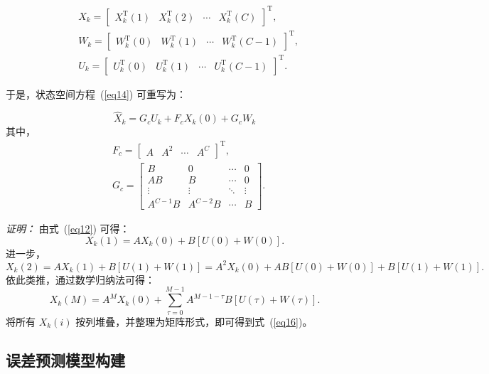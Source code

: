 \begin{equation}
\begin{aligned}
& X_k =\left[\begin{array}{llll}
X_k^{\mathrm{T}}(1) & X_k^{\mathrm{T}}(2) & \cdots & X_k^{\mathrm{T}}(C)
\end{array}\right]^{\mathrm{T}}, \\
& W_k =\left[\begin{array}{llll}
W_k^{\mathrm{T}}(0) & W_k^{\mathrm{T}}(1) & \cdots & W_k^{\mathrm{T}}(C-1)
\end{array}\right]^{\mathrm{T}}, \\
& U_k =\left[\begin{array}{llll}
U_k^{\mathrm{T}}(0) & U_k^{\mathrm{T}}(1) & \cdots & U_k^{\mathrm{T}}(C-1)
\end{array}\right]^{\mathrm{T}}.
\end{aligned}
\label{eq15}
\end{equation}

于是，状态空间方程~(\ref{eq14}) 可重写为：

\begin{equation}
\hat{X}_k=G_c U_k+F_c X_k(0)+G_c W_k
\label{eq16}
\end{equation}
其中，
\begin{equation*}
\begin{aligned}
& F_c  =\left[\begin{array}{ccccc}
A & A^2 & \cdots & A^C
\end{array}\right]^{\mathrm{T}}, \\
& G_c =\left[\begin{array}{cccc}
B & 0 & \cdots & 0 \\
A B & B & \cdots & 0 \\
\vdots & \vdots & \ddots & \vdots \\
A^{C-1}B  & A^{C-2} B & \cdots & B
\end{array}\right].
\end{aligned}
\end{equation*}

\noindent\textit{证明：}  
由式~(\ref{eq12}) 可得：
\[
X_k(1) = A X_k(0) + B[U(0) + W(0)].
\]
进一步，
\[
X_k(2) = A X_k(1) + B[U(1) + W(1)] = A^2 X_k(0) + A B[U(0) + W(0)] + B[U(1) + W(1)].
\]
依此类推，通过数学归纳法可得：
\[
X_k(M) = A^M X_k(0) + \sum_{\tau=0}^{M-1} A^{M-1-\tau} B [U(\tau) + W(\tau)].
\]
将所有 $X_k(i)$ 按列堆叠，并整理为矩阵形式，即可得到式~(\ref{eq16})。

\subsection{误差预测模型构建}
\label{3-2}

